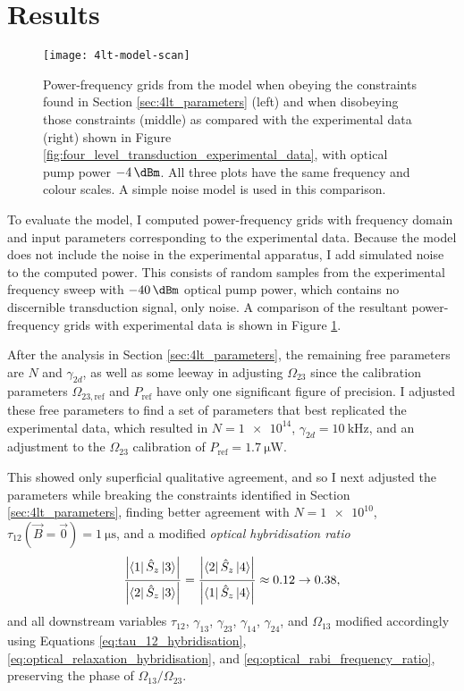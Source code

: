 \section{\label{sec:4lt_results}Results}
\begin{figure}[h]
\centering
\texttt{[image: 4lt-model-scan]}
\caption{\label{fig:4lt_model_scan} Power-frequency grids from the model when obeying the constraints found in Section \ref{sec:4lt_parameters} (left) and when disobeying those constraints (middle) as compared with the experimental data (right) shown in Figure \ref{fig:four_level_transduction_experimental_data}, with optical pump power $\qty{-4}{\dBm}$. All three plots have the same frequency and colour scales. A simple noise model is used in this comparison.}
\end{figure}

To evaluate the model, I computed power-frequency grids with frequency domain and input parameters corresponding to the experimental data. Because the model does not include the noise in the experimental apparatus, I add simulated noise to the computed power. This consists of random samples from the experimental frequency sweep with $\qty{-40}{\dBm}$ optical pump power, which contains no discernible transduction signal, only noise. A comparison of the resultant power-frequency grids with experimental data is shown in Figure \ref{fig:4lt_model_scan}.

After the analysis in Section \ref{sec:4lt_parameters}, the remaining free parameters are $N$ and $\gamma_{2d}$, as well as some leeway in adjusting $\Omega_{23}$ since the calibration parameters $\Omega_{23,\text{ref}}$ and $P_\text{ref}$ have only one significant figure of precision. I adjusted these free parameters to find a set of parameters that best replicated the experimental data, which resulted in $N=\num{1e14}$, $\gamma_{2d}=\qty{10}{\kilo\hertz}$, and an adjustment to the $\Omega_{23}$ calibration of $P_\text{ref}=\qty{1.7}{\micro\watt}$.

This showed only superficial qualitative agreement, and so I next adjusted the parameters while breaking the constraints identified in Section \ref{sec:4lt_parameters}, finding better agreement with $N=\num{1e10}$, $\tau_{12}(\vec{B}=\vec{0})=\qty{1}{\micro\second}$, and a modified \textit{optical hybridisation ratio}
\begin{equation}
    \frac{\left|\left\langle1\right|\hat{S}_z\left|3\right\rangle\right|}{\left|\left\langle2\right|\hat{S}_z\left|3\right\rangle\right|} = \frac{\left|\left\langle2\right|\hat{S}_z\left|4\right\rangle\right|}{\left|\left\langle1\right|\hat{S}_z\left|4\right\rangle\right|} \approx \num{0.12} \to \num{0.38},
\end{equation}
and all downstream variables $\tau_{12}$, $\gamma_{13}$, $\gamma_{23}$, $\gamma_{14}$, $\gamma_{24}$, and $\Omega_{13}$ modified accordingly using Equations \ref{eq:tau_12_hybridisation}, \ref{eq:optical_relaxation_hybridisation}, and \ref{eq:optical_rabi_frequency_ratio}, preserving the phase of $\Omega_{13}/\Omega_{23}$.

